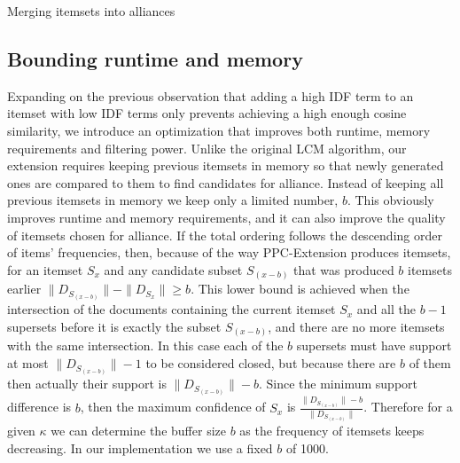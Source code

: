 \documentclass{sig-alternate}
\begin{document}
\begin{algorithm}
\SetAlgoLined
\LinesNumbered
{}
\;
\caption{Merging itemsets into alliances}
\label{algo:alliance}
\end{algorithm}


\subsection{Bounding runtime and memory}
\label{}
Expanding on the previous observation that adding a high IDF term to an itemset with low IDF terms only prevents achieving a high enough cosine similarity, we introduce an optimization that improves both runtime, memory requirements and filtering power. Unlike the original LCM algorithm, our extension requires keeping previous itemsets in memory so that newly generated ones are compared to them to find candidates for alliance. Instead of keeping all previous itemsets in memory we keep only a limited number, $b$. This obviously improves runtime and memory requirements, and it can also improve the quality of itemsets chosen for alliance. If the total ordering follows the descending order of items' frequencies, then, because of the way PPC-Extension produces itemsets, for an itemset $S_x$ and any candidate subset $S_{(x-b)}$ that was produced $b$ itemsets earlier $\|D_{S_{(x-b)}}\| - \|D_{S_x}\| \ge b$. This lower bound is achieved when the intersection of the documents containing the current itemset $S_x$ and all the $b-1$ supersets before it is exactly the subset $S_{(x-b)}$, and there are no more itemsets with the same intersection. In this case each of the $b$ supersets must have support at most $\|D_{S_{(x-b)}}\| - 1$ to be considered closed, but because there are $b$ of them then actually their support is $\|D_{S_{(x-b)}}\| - b$. Since the minimum support difference is $b$, then the maximum confidence of $S_x$ is $\frac{\|D_{S_{(x-b)}}\| - b}{\|D_{S_{(x-b)}}\|} $. Therefore for a given $\kappa$ we can determine the buffer size $b$ as the frequency of itemsets keeps decreasing. In our implementation we use a fixed $b$ of 1000.
\end{document}
